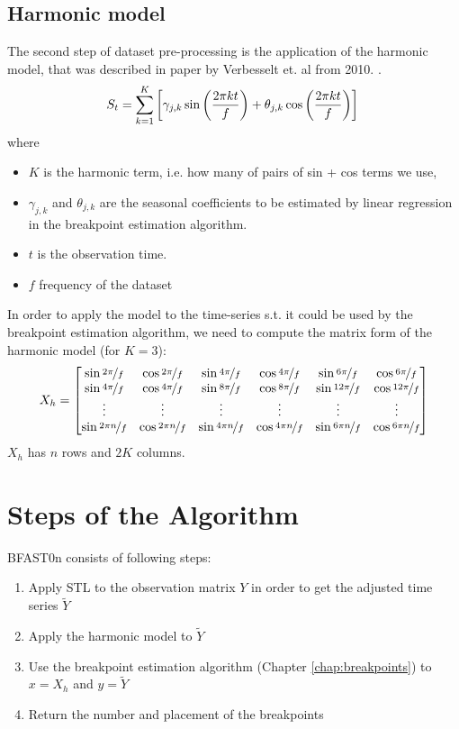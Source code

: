 \documentclass[main.tex]{subfiles}
\begin{document}
\subsection{Harmonic model}
\label{subsec:harmonic_model}
The second step of dataset pre-processing is the application of the harmonic
model, that was described in paper by Verbesselt et. al from 2010.
\cite{bfast1}.
\[
S_{t} =
\sum_{k=1}^{K}\left[\gamma_{j, k} \sin \left(\frac{2 \pi k t}{f}\right)+
  \theta_{j, k} \cos \left(\frac{2 \pi k t}{f}\right)\right]\\
\]
where
\begin{itemize}
\item $K$ is the harmonic term, i.e. how many of pairs of sin + cos terms we use,
\item $\gamma_{j, k}$ and $\theta_{j, k}$ are the seasonal coefficients to be
  estimated by linear regression in the breakpoint estimation algorithm.
\item $t$ is the observation time.
\item $f$ frequency of the dataset
\end{itemize}
In order to apply the model to the time-series s.t. it could be used by the
breakpoint estimation algorithm, we need to compute the matrix form of the
harmonic model (for $K=3$):
\[
X_{h} =
\begin{bmatrix}
  \sin\nicefrac{2 \pi}{f} & \cos\nicefrac{2 \pi}{f} & \sin\nicefrac{4 \pi}{f} & \cos\nicefrac{4
    \pi}{f} &  \sin\nicefrac{6 \pi}{f} & \cos\nicefrac{6 \pi}{f} \\
  \sin\nicefrac{4 \pi}{f} & \cos\nicefrac{4 \pi}{f} & \sin\nicefrac{8 \pi}{f} & \cos\nicefrac{8
    \pi}{f} &  \sin\nicefrac{12 \pi}{f} & \cos\nicefrac{12 \pi}{f} \\
  \vdots & \vdots  & \vdots & \vdots & \vdots & \vdots \\
  \sin\nicefrac{2 \pi n}{f} & \cos\nicefrac{2 \pi n}{f} & \sin\nicefrac{4 \pi n}{f} &
  \cos\nicefrac{4 \pi n}{f} &  \sin\nicefrac{6 \pi n}{f} & \cos\nicefrac{6 \pi n}{f}
\end{bmatrix}
\]
$X_h$ has $n$ rows and $2K$ columns.

\section{Steps of the Algorithm}
\label{sec:bfast0n_algorithm_steps}
BFAST0n consists of following steps:
\begin{enumerate}
\item Apply STL to the observation matrix $Y$ in order to get the adjusted
  time series $\tilde{Y}$
\item Apply the harmonic model to $\tilde{Y}$
\item Use the breakpoint estimation algorithm (Chapter \ref{chap:breakpoints})
  to $x=X_h$ and $y=\tilde{Y}$
\item Return the number and placement of the breakpoints
\end{enumerate}
\end{document}
